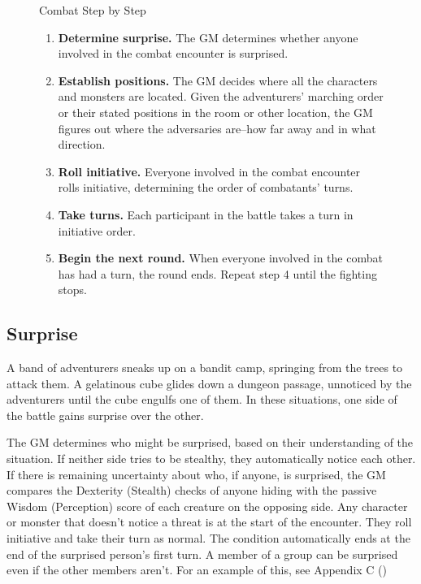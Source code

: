 \begin{figure}[htb]
    \begin{DndComment}{Combat Step by Step\label{cmt:combat-step-by-step}}
        \begin{enumerate}
            \item \textbf{Determine surprise.} The GM determines whether anyone involved in the combat encounter is surprised.
            \item \textbf{Establish positions.} The GM decides where all the characters and monsters are located. Given the adventurers' marching order or their stated positions in the room or other location, the GM figures out where the adversaries are--how far away and in what direction.
            \item \textbf{Roll initiative.} Everyone involved in the combat encounter rolls initiative, determining the order of combatants' turns.
            \item \textbf{Take turns.} Each participant in the battle takes a turn in initiative order.
            \item \textbf{Begin the next round.} When everyone involved in the combat has had a turn, the round ends. Repeat step 4 until the fighting stops.
        \end{enumerate}
    \end{DndComment}
\end{figure}

\subsection{Surprise}

A band of adventurers sneaks up on a bandit camp, springing from the trees to attack them. A gelatinous cube glides down a dungeon passage, unnoticed by the adventurers until the cube engulfs one of them. In these situations, one side of the battle gains surprise over the other.

The GM determines who might be surprised, based on their understanding of the situation. If neither side tries to be stealthy, they automatically notice each other. If there is remaining uncertainty about who, if anyone, is surprised, the GM compares the Dexterity (Stealth) checks of anyone hiding with the passive Wisdom (Perception) score of each creature on the opposing side. Any character or monster that doesn't notice a threat is  at the start of the encounter. They roll initiative and take their turn as normal. The condition automatically ends at the end of the surprised person's first turn. A member of a group can be surprised even if the other members aren't. For an example of this, see Appendix C ()

